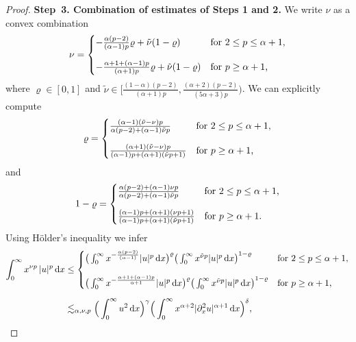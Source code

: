 \documentclass[reqno,12pt]{amsart}
\renewcommand{\d}{\ensuremath{\mathrm{d}}}
\renewcommand{\d}{\ensuremath{{\rm d}}}
\numberwithin{equation}{section}
\begin{document}
\begin{proof}
\noindent\textbf{Step~3. Combination of estimates of Steps 1 and 2.}  We write $\nu$ as a convex combination
%
\begin{equation*}
    \nu = \begin{cases} -\frac{\alpha (p-2)}{(\alpha -1) p} \varrho + \tilde \nu (1-\varrho) & \text{for $2 \leq p \leq \alpha +1$,}\\[0.4cm]
     - \frac{\alpha +1 + (\alpha-1)p}{(\alpha +1) p} \varrho + \tilde \nu (1-\varrho) & \text{for $ p \geq \alpha +1$,}
    \end{cases}
  \end{equation*}
%
where $\varrho \in [0,1]$ and $\tilde\nu \in \big[\frac{(1-\alpha)(p-2)}{(\alpha +1) p}, \frac{(\alpha+2) (p-2)}{(5\alpha +3) p}\big)$. We can explicitly compute
 \[
 \varrho = \begin{cases} \frac{(\alpha-1) (\tilde\nu-\nu) p}{\alpha (p-2) + (\alpha-1) \tilde\nu p} & \text{for $2 \leq p \leq \alpha +1$,}\\[0.4cm]
 \frac{(\alpha+1) (\tilde\nu-\nu) p}{(\alpha-1) p + (\alpha+1) (\tilde\nu p + 1)} & \text{for $ p \geq \alpha +1$,}
 \end{cases}
 \]
 and
\[
 1-\varrho = \begin{cases} \frac{\alpha (p-2) + (\alpha-1) \nu p}{\alpha (p-2) + (\alpha-1) \tilde\nu p} & \text{for $2 \leq p \leq \alpha +1$,}\\[0.4cm]
 \frac{(\alpha-1) p + (\alpha+1) (\nu p + 1)}{(\alpha-1) p + (\alpha+1) (\tilde\nu p + 1)} & \text{for $ p \geq \alpha +1$.}
 \end{cases}
 \]
Using H\"older's inequality we infer
%
\begin{align}
   \int_0^\infty x^{\nu p} \, |u|^p \, \d x 
     &\le \begin{cases} \big(\int_0^\infty x^{-\frac{\alpha (p-2)}{(\alpha -1)}} |u|^p \, \d x\big)^\varrho \big(\int_0^\infty x^{\tilde\nu p} |u|^p \, \d x\big)^{1-\varrho} & \text{for $2 \leq p \leq \alpha +1$,} \\[0.4cm]
     \big(\int_0^\infty x^{-\frac{\alpha +1 + (\alpha-1)p}{\alpha +1}} |u|^p \, \d x\big)^\varrho \big(\int_0^\infty x^{\tilde\nu p} |u|^p \, \d x\big)^{1-\varrho} & \text{for $p \geq \alpha +1$,} \end{cases} \nonumber \\[0.2cm]
     &\lesssim_{\alpha,\nu,p} \Big( \int_0^\infty u^2 \, \d x\Big)^{\gamma} \Big( \int_0^\infty x^{\alpha+2} |\partial_x^2 u|^{\alpha +1} \, \d x \Big)^{\delta}, \label{eq:scaling lp}
 \end{align}

\end{proof}
\end{document}
